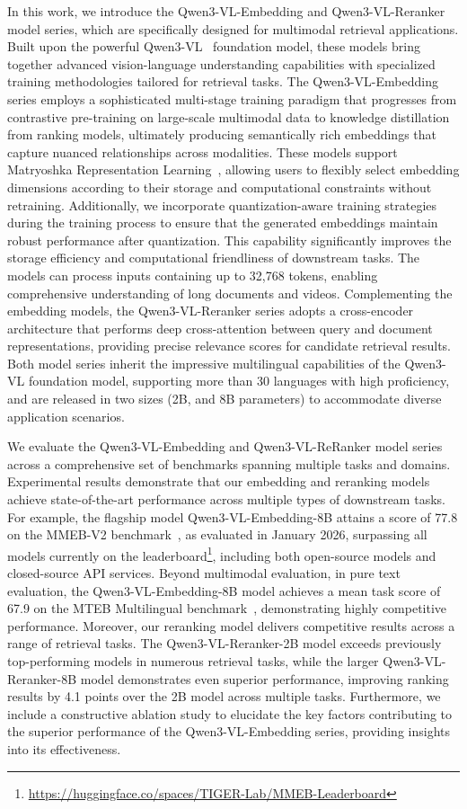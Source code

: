 \documentclass{article} %
\begin{document}
In this work, we introduce the Qwen3-VL-Embedding and Qwen3-VL-Reranker model series, which are specifically designed for multimodal retrieval applications. Built upon the powerful Qwen3-VL~\citep{Qwen3-VL} foundation model, these models bring together advanced vision-language understanding capabilities with specialized training methodologies tailored for retrieval tasks. The Qwen3-VL-Embedding series employs a sophisticated multi-stage training paradigm that progresses from contrastive pre-training on large-scale multimodal data to knowledge distillation from ranking models, ultimately producing semantically rich embeddings that capture nuanced relationships across modalities. These models support Matryoshka Representation Learning~\citep{kusupati2022matryoshka}, allowing users to flexibly select embedding dimensions according to their storage and computational constraints without retraining. Additionally, we incorporate quantization-aware training strategies during the training process to ensure that the generated embeddings maintain robust performance after quantization. This capability significantly improves the storage efficiency and computational friendliness of downstream tasks. The models can process inputs containing up to 32,768 tokens, enabling comprehensive understanding of long documents and videos. Complementing the embedding models, the Qwen3-VL-Reranker series adopts a cross-encoder architecture that performs deep cross-attention between query and document representations, providing precise relevance scores for candidate retrieval results. Both model series inherit the impressive multilingual capabilities of the Qwen3-VL foundation model, supporting more than 30 languages with high proficiency, and are released in two sizes (2B, and 8B parameters) to accommodate diverse application scenarios.

We evaluate the Qwen3-VL-Embedding and Qwen3-VL-ReRanker model series across a comprehensive set of benchmarks spanning multiple tasks and domains. Experimental results demonstrate that our embedding and reranking models achieve state-of-the-art performance across multiple types of downstream tasks. For example, the flagship model Qwen3-VL-Embedding-8B attains a score of 77.8 on the MMEB-V2 benchmark~\citep{meng2025vlm2vec}, as evaluated in January 2026, surpassing all models currently on the leaderboard\footnote{\url{https://huggingface.co/spaces/TIGER-Lab/MMEB-Leaderboard}}, including both open-source models and closed-source API services. Beyond multimodal evaluation, in pure text evaluation, the Qwen3-VL-Embedding-8B model achieves a mean task score of 67.9 on the MTEB Multilingual benchmark~\citep{enevoldsen2025mmteb}, demonstrating highly competitive performance. Moreover, our reranking model delivers competitive results across a range of retrieval tasks. The Qwen3-VL-Reranker-2B model exceeds previously top-performing models in numerous retrieval tasks, while the larger Qwen3-VL-Reranker-8B model demonstrates even superior performance, improving ranking results by 4.1 points over the 2B model across multiple tasks. Furthermore, we include a constructive ablation study to elucidate the key factors contributing to the superior performance of the Qwen3-VL-Embedding series, providing insights into its effectiveness.
\end{document}
